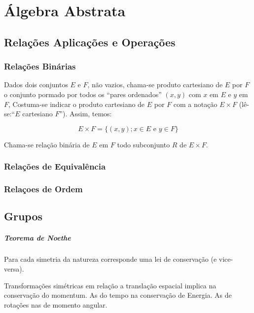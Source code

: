 
\chapter{Álgebra Abstrata}

\section{Relações Aplicações e Operações}

\subsection{Relações Binárias}

\begin{defi}
Dados dois conjuntos $E$ e $F$, não vazios, chama-se produto cartesiano de $E$ por $F$ o conjunto pormado por todos os ``pares ordenados'' $(x,y)$ com $x$ em $E$ e $y$ em $F$, Costuma-se indicar o produto cartesiano de $E$ por $F$ com a notação $E\times F$ (lê-se:``$E$ cartesiano $F$''). Assim, temos:

\begin{equation*}
    E\times F=\{(x,y); x\in E \mbox{ e }y \in F\}
\end{equation*}
\end{defi}

\begin{defi}
Chama-se relação binária de $E$ em $F$ todo subconjunto $R$ de $E \times F$.
\end{defi}

\subsection{Relações de Equivalência}

\subsection{Relaçoes de Ordem}

\section{Grupos}
\paragraph{Teorema de Noethe} Para cada simetria da natureza corresponde uma lei de conservação (e vice-versa).

Transformações simétricas em relação a translação espacial implica na conservação do momentum. As do tempo na conservação de Energia. As de rotações nas de momento angular.

